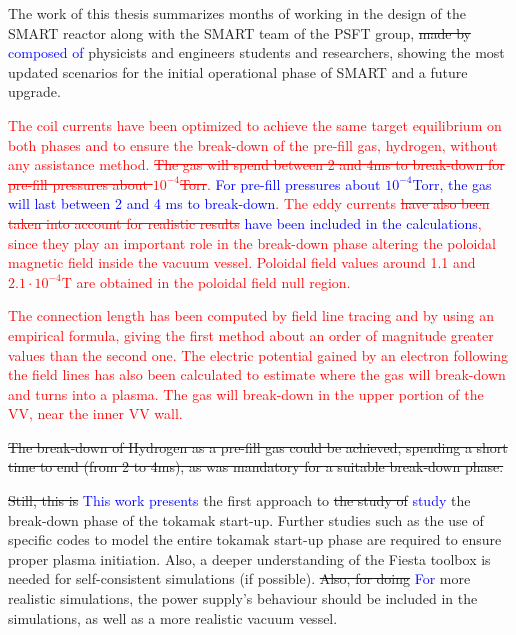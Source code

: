 \documentclass[a4paper,12pt,oneside]{book}
\begin{document}
The work of this thesis summarizes months of working in the design of the SMART reactor along with the SMART team of the PSFT group, \st{made by} \textcolor{blue}{composed of} physicists and engineers students and researchers, showing the most updated scenarios for the initial operational phase of SMART and a future upgrade. 

\textcolor{red}{The coil currents have been optimized to achieve the same target equilibrium on both phases and to ensure the break-down of the pre-fill gas, hydrogen, without any assistance method. \st{The gas will spend between 2 and 4ms to break-down for pre-fill pressures about $10^{-4}$Torr}. \textcolor{blue}{For pre-fill pressures about $10^{-4}$Torr, the gas will last between 2 and 4 ms to break-down}. The eddy currents \st{have also been taken into account for realistic results} \textcolor{blue}{have been included in the calculations}, since they play an important role in the break-down phase altering the poloidal magnetic field inside the vacuum vessel. Poloidal field values around 1.1 and $2.1\cdot 10^{-4}$T are obtained in the poloidal field null region.}

\textcolor{red}{The connection length has been computed by field line tracing and by using an empirical formula, giving the first method about an order of magnitude greater values than the second one. The electric potential gained by an electron following the field lines has also been calculated to estimate where the gas will break-down and turns into a plasma. The gas will break-down in the upper portion of the VV, near the inner VV wall.}

\st{The break-down of Hydrogen as a pre-fill gas could be achieved, spending a short time to end (from 2 to 4ms), as was mandatory for a suitable break-down phase.}

\st{Still, this is} \textcolor{blue}{This work presents} the first approach to \st{the study of} \textcolor{blue}{study} the break-down phase of the tokamak start-up. Further studies such as the use of specific codes to model the entire tokamak start-up phase are required to ensure proper plasma initiation. Also, a deeper understanding of the Fiesta toolbox is needed for self-consistent simulations (if possible). \st{Also, for doing} \textcolor{blue}{For} more realistic simulations, the power supply's behaviour should be included in the simulations, as well as a more realistic vacuum vessel.


\end{document}

